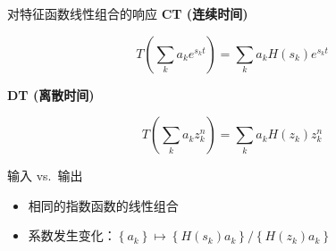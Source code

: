 \documentclass[
  ignorenonframetext,
]{beamer}
\providecommand{\tightlist}{%
  \setlength{\itemsep}{0pt}\setlength{\parskip}{0pt}}
\begin{document}
\begin{frame}{对特征函数线性组合的响应}
\protect{}\label{ux5bf9ux7279ux5f81ux51fdux6570ux7ebfux6027ux7ec4ux5408ux7684ux54cdux5e94}
\textbf{CT (连续时间)}

\[
T\left(\sum_{k} a_{k} e^{s_{k} t}\right)=\sum_{k} a_{k} H\left(s_{k}\right) e^{s_{k} t}
\]

\textbf{DT (离散时间)}

\[
T\left(\sum_{k} a_{k} z_{k}^{n}\right)=\sum_{k} a_{k} H\left(z_{k}\right) z_{k}^{n}
\]

输入 vs.~输出

\begin{itemize}
\tightlist
\item
  相同的指数函数的线性组合
\item
  系数发生变化：\(\left\{a_{k}\right\} \mapsto\left\{H\left(s_{k}\right) a_{k}\right\} /\left\{H\left(z_{k}\right) a_{k}\right\}\)
\end{itemize}
\end{frame}
\end{document}
